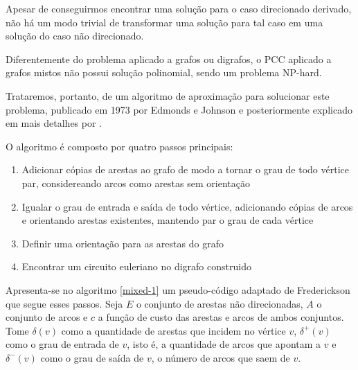     Apesar de conseguirmos encontrar uma solução para o caso direcionado derivado, não há um modo trivial de transformar uma solução para tal caso em uma solução do caso não direcionado.

    Diferentemente do problema aplicado a grafos ou digrafos, o PCC aplicado a grafos mistos não possui solução polinomial, sendo um problema NP-hard. 




    Trataremos, portanto, de um algoritmo de aproximação para solucionar este problema, publicado em 1973 por Edmonds e Johnson \cite{edmonds-johnson} e posteriormente explicado em mais detalhes por .

    O algoritmo é composto por quatro passos principais:

    \begin{enumerate}
        \item Adicionar cópias de arestas ao grafo de modo a tornar o grau de todo vértice par, considereando arcos como arestas sem orientação
        \item Igualar o grau de entrada e saída de todo vértice, adicionando cópias de arcos e orientando arestas existentes, mantendo par o grau de cada vértice
        \item Definir uma orientação para as arestas do grafo
        \item Encontrar um circuito euleriano no digrafo construido
    \end{enumerate}
    

    Apresenta-se no algoritmo \ref{mixed-1} um pseudo-código adaptado de Frederickson \cite{frederickson} que segue esses passos.
    Seja $E$ o conjunto de arestas não direcionadas, $A$ o conjunto de arcos e $c$ a função de custo das arestas e arcos de ambos conjuntos.
    Tome $\delta(v)$ como a quantidade de arestas que incidem no vértice $v$, $\delta^+(v)$ como o grau de entrada de $v$, isto é, a quantidade de arcos que apontam a $v$ e $\delta^-(v)$ como o grau de saída de $v$, o número de arcos que saem de $v$.

